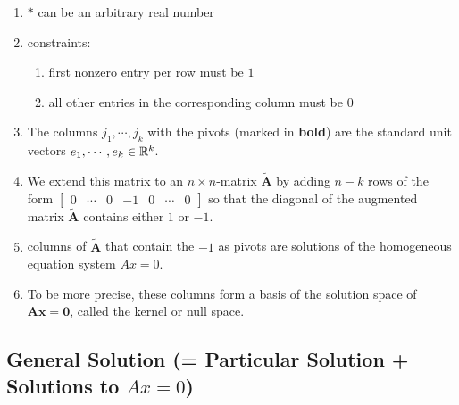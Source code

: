 \begin{enumerate}
    \item $*$ can be an arbitrary real number
    \hfill \cite{mfml/book/mml/Deisenroth-Faisal-Ong}

    \item constraints:
    \begin{enumerate}
        \item first nonzero entry per row must be $1$
        \hfill \cite{mfml/book/mml/Deisenroth-Faisal-Ong}

        \item all other entries in the corresponding column must be $0$
        \hfill \cite{mfml/book/mml/Deisenroth-Faisal-Ong}
    \end{enumerate}

    \item The columns $j_1, \cdots , j_k$ with the pivots (marked in \textbf{bold}) are the standard unit vectors $e_1, \cdots , e_k \in \mathbb{R}^k$.
    \hfill \cite{mfml/book/mml/Deisenroth-Faisal-Ong}

    \item We extend this matrix to an $n \times n$-matrix $\tilde{\bm{A}}$ by adding $n - k$ rows of the form 
    $
        \begin{bmatrix}
            0 & \cdots & 0 & -1 & 0 & \cdots & 0
        \end{bmatrix}
    $
    so that the diagonal of the augmented matrix $\tilde{\bm{A}}$ contains either $1$ or $-1$.
    \hfill \cite{mfml/book/mml/Deisenroth-Faisal-Ong}

    \item columns of $\tilde{\bm{A}}$ that contain the $-1$ as pivots are solutions of the homogeneous equation system $Ax = 0$.
    \hfill \cite{mfml/book/mml/Deisenroth-Faisal-Ong}

    \item To be more precise, these columns form a basis of the solution space of $\bm{Ax} = \bm{0}$, called the kernel or null space.
    \hfill \cite{mfml/book/mml/Deisenroth-Faisal-Ong}
\end{enumerate}





\subsection{General Solution (= Particular Solution + Solutions to $Ax=0$)}

